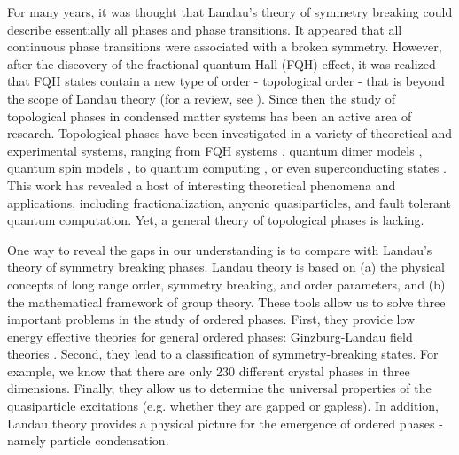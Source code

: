 \documentclass[aps,twocolumn,groupedaddress,showpacs,floatfix]{revtex4}
\begin{document}
For many years, it was thought that Landau's theory of symmetry breaking
\cite{L3726} could describe essentially all phases and phase transitions. It
appeared that all continuous phase transitions were associated with a broken
symmetry. However, after the discovery of the fractional quantum Hall (FQH)
effect, it was realized that FQH states contain a new type of order 
- topological order - that is beyond the scope of Landau theory (for a review,
  see ). Since then the study of topological phases in condensed
matter systems has been an active area of research. Topological phases have
been investigated in a variety of theoretical and experimental systems,
ranging from FQH systems \cite{WNtop,BWkmat2,R9002,FK9169}, quantum dimer
models \cite{RK8876,RC8933,MS0181,AFF0493} , quantum spin models
\cite{KL8795,WWZcsp,Wrig,RS9173,Wsrvb,SF0050,Wqoslpub,SP0258,BFG0212}, to
quantum computing \cite{K032,IFI0203}, or even superconducting states
\cite{Wtopcs,HOS0427}.  This work has revealed a host of interesting
theoretical phenomena and applications, including fractionalization, anyonic
quasiparticles, and fault tolerant quantum computation. Yet, a general theory
of topological phases is lacking.

One way to reveal the gaps in our understanding is to compare with Landau's
theory of symmetry breaking phases. Landau theory is based on (a) the physical
concepts of long range order, symmetry breaking, and order parameters, and (b)
the mathematical framework of group theory. These tools allow us to solve
three important problems in the study of ordered phases. First, they provide
low energy effective theories for general ordered phases: Ginzburg-Landau
field theories \cite{GL5064}. Second, they lead to a classification of
symmetry-breaking states. For example, we know that there are only 230
different crystal phases in three dimensions. Finally, they allow us to
determine the universal properties of the quasiparticle excitations (e.g.
whether they are gapped or gapless). In addition, Landau theory provides a
physical picture for the emergence of ordered phases - namely particle
condensation. 
\end{document}

